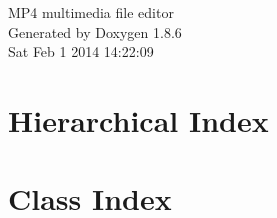 \documentclass[twoside]{book}
\newcommand{\clearemptydoublepage}{%
  \newpage{\pagestyle{empty}\cleardoublepage}%
}
\begin{document}
\hypersetup{pageanchor=false}
\begin{titlepage}
\vspace*{7cm}
\begin{center}%
{\Large M\-P4 multimedia file editor }\\
\vspace*{1cm}
{\large Generated by Doxygen 1.8.6}\\
\vspace*{0.5cm}
{\small Sat Feb 1 2014 14:22:09}\\
\end{center}
\end{titlepage}
\clearemptydoublepage
\tableofcontents
\clearemptydoublepage
{}
\hypersetup{pageanchor=true}

\chapter{Hierarchical Index}

\chapter{Class Index}

\end{document}
